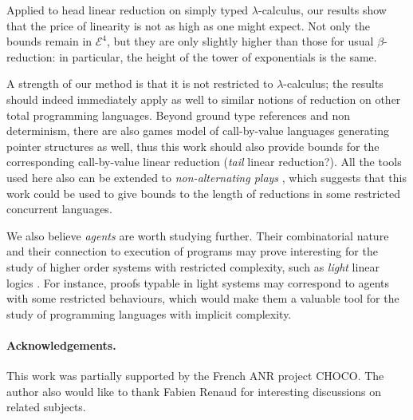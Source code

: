 \documentclass{article}
\begin{document}
Applied to head linear reduction on simply typed $\lambda$-calculus, our results show that the price of linearity is not as high as one might expect. 
Not only the bounds remain in $\mathcal{E}^4$, but they are only slightly higher than those for usual $\beta$-reduction: in particular, the height 
of the tower of exponentials is the same.

A strength of our method is that it is not restricted to $\lambda$-calculus; the results should indeed immediately apply as well to similar notions of reduction on other total
programming languages. Beyond ground type references and non determinism, there are also games model of call-by-value languages \cite{abramsky-mccusker:families} generating pointer structures as well, thus this work should also provide
bounds for the corresponding call-by-value linear reduction (\emph{tail} linear reduction?). All the tools used here also can be extended to \emph{non-alternating plays} \cite{DBLP:conf/concur/Laird05}, which suggests that this work could
be used to give bounds to the length of reductions in some restricted concurrent languages.

We also believe \emph{agents} are worth studying further. Their combinatorial nature and their connection to execution of programs may prove interesting for the study of higher order systems with restricted complexity, 
such as \emph{light} linear logics \cite{DBLP:journals/iandc/Girard98}. For instance, proofs typable in light systems may correspond to agents with some restricted behaviours, which would make them a valuable tool for 
the study of programming languages with implicit complexity.

\paragraph{Acknowledgements.} This work was partially supported by the French ANR project CHOCO. The author also would like to thank Fabien Renaud for interesting discussions on related subjects.
\end{document}
